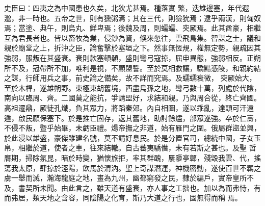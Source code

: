 \begin{pinyinscope}
 史臣曰：四夷之為中國患也久矣，北狄尤甚焉。種落實
 繁，迭雄邊塞，年代遐邈，非一時也。五帝之世，則有獯粥焉；其在三代，則獫狁焉；逮乎兩漢，則匈奴焉；當塗、典午，則烏丸、鮮卑焉；後魏及周，則蠕蠕、突厥焉。此其酋豪，相繼互為君長者也。皆以畜牧為業，侵鈔為資，倏來忽往，雲飛鳥集。智謀之士，議和親於廟堂之上，折沖之臣，論奮擊於塞垣之下。然事無恆規，權無定勢，親疏因其強弱，服叛在其盛衰。衰則款塞頓顙，盛則彎弓寇掠，屈申異態，強弱相反。正朔所不及，冠帶所不加，唯利是視，不顧盟誓。至於莫相救讓，驕黠憑陵，和親約結之謀，行師用兵之事，前史論之備矣，故不詳而究焉。及蠕蠕衰微，
 突厥始大，至於木桿，遂雄朔野。東極東胡舊境，西盡烏孫之地，彎弓數十萬，列處於代陰，南向以臨周、齊。二國莫之能抗，爭請盟好，求結和親。乃與周合從，終亡齊國。高祖遷鼎，厥徒孔熾，負其眾力，將蹈秦郊。內自相圖，遂以乖亂，達頭可汗遠遁，啟民願保塞下。於是推亡固存，返其舊地，助討餘燼，部眾遂強。卒於仁壽，不侵不叛，暨乎始畢，未虧臣禮。煬帝撫之非道，始有雁門之圍。俄屬群盜並興，於此浸以雄盛，豪傑雖建名號，莫不請好息民。於是分置官司，總統中國，子女玉帛，相繼於道，使者之車，往來結轍。自古蕃夷驕僭，未有若斯之甚也。及聖
 哲膺期，掃除氛昆，暗於時變，猶懷旅拒，率其群醜，屢隳亭鄣，殘毀我雲、代，搖蕩我太原，肆掠於涇陽，飲馬於渭汭。聖上奇謀潛運，神機密動，遂使百世不羈之虜一舉而滅，瀚海龍庭之地，畫為九州，幽都窮發之民，隸於編戶，實帝皇所不及，書契所未聞。由此言之，雖天道有盛衰，亦人事之工拙也。加以為而弗恃，有而弗居，類天地之含容，同陰陽之化育，斯乃大道之行也，固無得而稱
 焉。



\end{pinyinscope}